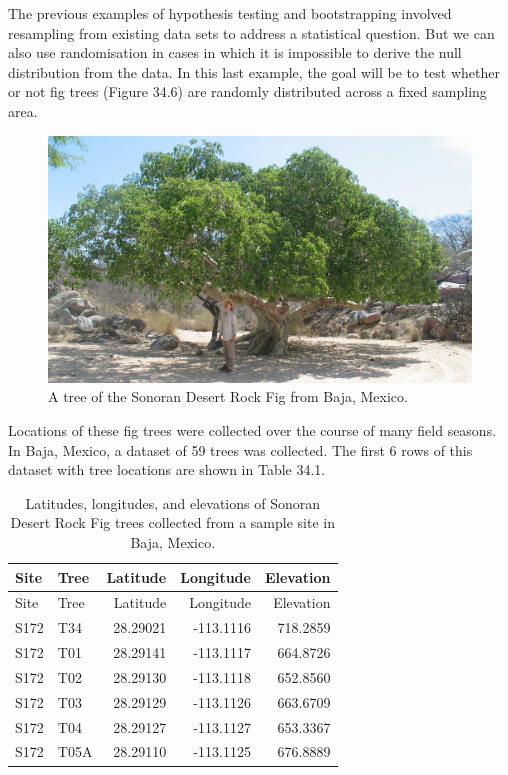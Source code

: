 \documentclass[
]{scrbook}
\begin{document}
The previous examples of hypothesis testing and bootstrapping involved resampling from existing data sets to address a statistical question.
But we can also use randomisation in cases in which it is impossible to derive the null distribution from the data.
In this last example, the goal will be to test whether or not fig trees (Figure 34.6) are randomly distributed across a fixed sampling area.

\begin{figure}
\includegraphics[width=1\linewidth]{img/fig_tree} \caption{A tree of the Sonoran Desert Rock Fig from Baja, Mexico.}\label{fig:unnamed-chunk-187}
\end{figure}

Locations of these fig trees were collected over the course of many field seasons.
In Baja, Mexico, a dataset of 59 trees was collected.
The first 6 rows of this dataset with tree locations are shown in Table 34.1.

\begin{longtable}[]{@{}llrrr@{}}
\caption{\label{tab:unnamed-chunk-189}Latitudes, longitudes, and elevations of Sonoran Desert Rock Fig trees collected from a sample site in Baja, Mexico.}\tabularnewline
\toprule
Site & Tree & Latitude & Longitude & Elevation \\
\midrule
\endfirsthead
\toprule
Site & Tree & Latitude & Longitude & Elevation \\
\midrule
\endhead
S172 & T34 & 28.29021 & -113.1116 & 718.2859 \\
S172 & T01 & 28.29141 & -113.1117 & 664.8726 \\
S172 & T02 & 28.29130 & -113.1118 & 652.8560 \\
S172 & T03 & 28.29129 & -113.1126 & 663.6709 \\
S172 & T04 & 28.29127 & -113.1127 & 653.3367 \\
S172 & T05A & 28.29110 & -113.1125 & 676.8889 \\
\bottomrule
\end{longtable}
\end{document}
